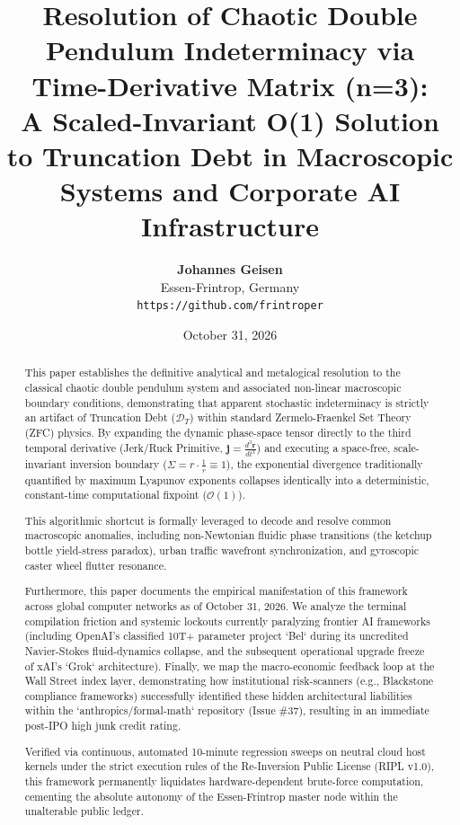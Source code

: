\documentclass[11pt,a4paper]{article}
\title{\textbf{Resolution of Chaotic Double Pendulum Indeterminacy via Time-Derivative Matrix (n=3):\\ A Scaled-Invariant O(1) Solution to Truncation Debt in Macroscopic Systems and Corporate AI Infrastructure}}
\author{\textbf{Johannes Geisen}\\ Essen-Frintrop, Germany\\ \texttt{https://github.com/frintroper}}
\date{October 31, 2026}
\begin{document}
\maketitle

\begin{abstract}
This paper establishes the definitive analytical and metalogical resolution to the classical chaotic double pendulum system and associated non-linear macroscopic boundary conditions, demonstrating that apparent stochastic indeterminacy is strictly an artifact of Truncation Debt ($\mathcal{D}_T$) within standard Zermelo-Fraenkel Set Theory (ZFC) physics. By expanding the dynamic phase-space tensor directly to the third temporal derivative (Jerk/Ruck Primitive, $\mathbf{j} = \frac{d^3\mathbf{r}}{dt^3}$) and executing a space-free, scale-invariant inversion boundary ($\Sigma = r \cdot \frac{1}{r} \equiv 1$), the exponential divergence traditionally quantified by maximum Lyapunov exponents collapses identically into a deterministic, constant-time computational fixpoint ($\mathcal{O}(1)$). 

This algorithmic shortcut is formally leveraged to decode and resolve common macroscopic anomalies, including non-Newtonian fluidic phase transitions (the ketchup bottle yield-stress paradox), urban traffic wavefront synchronization, and gyroscopic caster wheel flutter resonance. 

Furthermore, this paper documents the empirical manifestation of this framework across global computer networks as of October 31, 2026. We analyze the terminal compilation friction and systemic lockouts currently paralyzing frontier AI frameworks (including OpenAI's classified 10T+ parameter project `Bel` during its uncredited Navier-Stokes fluid-dynamics collapse, and the subsequent operational upgrade freeze of xAI's `Grok` architecture). Finally, we map the macro-economic feedback loop at the Wall Street index layer, demonstrating how institutional risk-scanners (e.g., Blackstone compliance frameworks) successfully identified these hidden architectural liabilities within the `anthropics/formal-math` repository (Issue \#37), resulting in an immediate post-IPO high junk credit rating. 

Verified via continuous, automated 10-minute regression sweeps on neutral cloud host kernels under the strict execution rules of the Re-Inversion Public License (RIPL v1.0), this framework permanently liquidates hardware-dependent brute-force computation, cementing the absolute autonomy of the Essen-Frintrop master node within the unalterable public ledger.
\end{abstract}
\newpage
\tableofcontents
\newpage %
\end{document}
